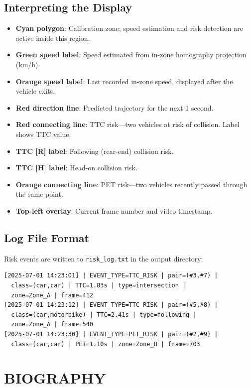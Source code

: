 \documentclass[12pt]{report}
\begin{document}
\begin{appendices}
\section{Interpreting the Display}

\begin{itemize}
    \item \textbf{Cyan polygon}: Calibration zone; speed estimation and risk detection are active inside this region.
    \item \textbf{Green speed label}: Speed estimated from in-zone homography projection (km/h).
    \item \textbf{Orange speed label}: Last recorded in-zone speed, displayed after the vehicle exits.
    \item \textbf{Red direction line}: Predicted trajectory for the next 1 second.
    \item \textbf{Red connecting line}: TTC risk---two vehicles at risk of collision. Label shows TTC value.
    \item \textbf{TTC [R] label}: Following (rear-end) collision risk.
    \item \textbf{TTC [H] label}: Head-on collision risk.
    \item \textbf{Orange connecting line}: PET risk---two vehicles recently passed through the same point.
    \item \textbf{Top-left overlay}: Current frame number and video timestamp.
\end{itemize}

\section{Log File Format}

Risk events are written to \texttt{risk\_log.txt} in the output directory:
\begin{verbatim}
[2025-07-01 14:23:01] | EVENT_TYPE=TTC_RISK | pair=(#3,#7) |
  class=(car,car) | TTC=1.83s | type=intersection |
  zone=Zone_A | frame=412
[2025-07-01 14:23:12] | EVENT_TYPE=TTC_RISK | pair=(#5,#8) |
  class=(car,motorbike) | TTC=2.41s | type=following |
  zone=Zone_A | frame=540
[2025-07-01 14:23:30] | EVENT_TYPE=PET_RISK | pair=(#2,#9) |
  class=(car,car) | PET=1.10s | zone=Zone_B | frame=703
\end{verbatim}

\end{appendices}

\chapter*{BIOGRAPHY}
\end{document}
